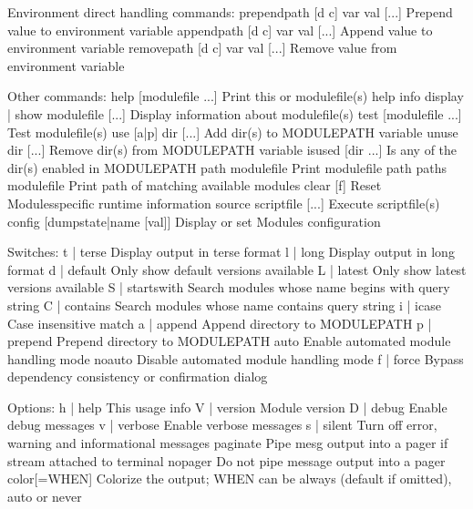 \documentclass[a4paper,10pt,english]{sphinxmanual}
\begin{document}
\begin{sphinxVerbatim}[commandchars=\\\{\}]
Environment direct handling commands:
  prepend\PYGZhy{}path [\PYGZhy{}d c] var val [...] Prepend value to environment variable
  append\PYGZhy{}path [\PYGZhy{}d c] var val [...]  Append value to environment variable
  remove\PYGZhy{}path [\PYGZhy{}d c] var val [...]  Remove value from environment variable

Other commands:
  help            [modulefile ...]  Print this or modulefile(s) help info
  display | show  modulefile [...]  Display information about modulefile(s)
  test            [modulefile ...]  Test modulefile(s)
  use     [\PYGZhy{}a|\PYGZhy{}p] dir [...]         Add dir(s) to MODULEPATH variable
  unuse           dir [...]         Remove dir(s) from MODULEPATH variable
  is\PYGZhy{}used         [dir ...]         Is any of the dir(s) enabled in MODULEPATH
  path            modulefile        Print modulefile path
  paths           modulefile        Print path of matching available modules
  clear           [\PYGZhy{}f]              Reset Modules\PYGZhy{}specific runtime information
  source          scriptfile [...]  Execute scriptfile(s)
  config [\PYGZhy{}\PYGZhy{}dump\PYGZhy{}state|name [val]]  Display or set Modules configuration

Switches:
  \PYGZhy{}t | \PYGZhy{}\PYGZhy{}terse    Display output in terse format
  \PYGZhy{}l | \PYGZhy{}\PYGZhy{}long     Display output in long format
  \PYGZhy{}d | \PYGZhy{}\PYGZhy{}default  Only show default versions available
  \PYGZhy{}L | \PYGZhy{}\PYGZhy{}latest   Only show latest versions available
  \PYGZhy{}S | \PYGZhy{}\PYGZhy{}starts\PYGZhy{}with
                  Search modules whose name begins with query string
  \PYGZhy{}C | \PYGZhy{}\PYGZhy{}contains Search modules whose name contains query string
  \PYGZhy{}i | \PYGZhy{}\PYGZhy{}icase    Case insensitive match
  \PYGZhy{}a | \PYGZhy{}\PYGZhy{}append   Append directory to MODULEPATH
  \PYGZhy{}p | \PYGZhy{}\PYGZhy{}prepend  Prepend directory to MODULEPATH
  \PYGZhy{}\PYGZhy{}auto          Enable automated module handling mode
  \PYGZhy{}\PYGZhy{}no\PYGZhy{}auto       Disable automated module handling mode
  \PYGZhy{}f | \PYGZhy{}\PYGZhy{}force    By\PYGZhy{}pass dependency consistency or confirmation dialog

Options:
  \PYGZhy{}h | \PYGZhy{}\PYGZhy{}help     This usage info
  \PYGZhy{}V | \PYGZhy{}\PYGZhy{}version  Module version
  \PYGZhy{}D | \PYGZhy{}\PYGZhy{}debug    Enable debug messages
  \PYGZhy{}v | \PYGZhy{}\PYGZhy{}verbose  Enable verbose messages
  \PYGZhy{}s | \PYGZhy{}\PYGZhy{}silent   Turn off error, warning and informational messages
  \PYGZhy{}\PYGZhy{}paginate      Pipe mesg output into a pager if stream attached to terminal
  \PYGZhy{}\PYGZhy{}no\PYGZhy{}pager      Do not pipe message output into a pager
  \PYGZhy{}\PYGZhy{}color[=WHEN]  Colorize the output; WHEN can be \PYGZsq{}always\PYGZsq{} (default if
                  omitted), \PYGZsq{}auto\PYGZsq{} or \PYGZsq{}never\PYGZsq{}
\end{sphinxVerbatim}
\end{document}
